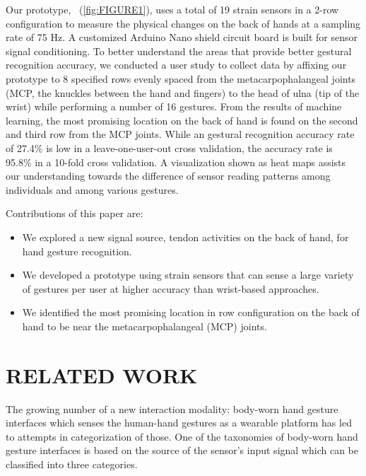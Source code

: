 \documentclass{sigchi}
\begin{document}
Our prototype, \getTitleName\ (\autoref{fig:FIGURE1}), uses a total of 19 strain sensors in a 2-row configuration to measure the physical changes on the back of hands at a sampling rate of 75 Hz. A customized Arduino Nano shield circuit board is built for sensor signal conditioning. To better understand the areas that provide better gestural recognition accuracy, we conducted a user study to collect data by affixing our prototype to 8 specified rows evenly spaced from the metacarpophalangeal joints (MCP, the knuckles between the hand and fingers) to the head of ulna (tip of the wrist) while performing a number of 16 gestures. From the results of machine learning, the most promising location on the back of hand is found on the second and third row from the MCP joints. While an gestural recognition accuracy rate of 27.4\% is low in a leave-one-user-out cross validation, the accuracy rate is 95.8\% in a 10-fold cross validation. A visualization shown as heat maps assists our understanding towards the difference of sensor reading patterns among individuals and among various gestures.

Contributions of this paper are:
\begin{itemize}
\item We explored a new signal source, tendon activities on the back of hand, for hand gesture recognition.
\item We developed a prototype using strain sensors that can sense a large variety of gestures per user at higher accuracy than wrist-based approaches. 
\item We identified the most promising location in row configuration on the back of hand to be near the metacarpophalangeal (MCP) joints.

\end{itemize}


\section{RELATED WORK}

The growing number of a new interaction modality: body-worn hand gesture interfaces which senses the human-hand gestures as a wearable platform has led to attempts in categorization of those. One of the taxonomies of body-worn hand gesture interfaces is based on the source of the sensor's input signal which can be classified into three categories.
\end{document}

